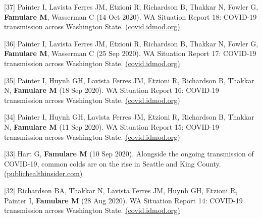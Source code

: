 \documentclass{article}
\begin{document}
\begin{llist}
\begin{items}
	\item[{[37]}] Painter I, Lavista Ferres JM, Etzioni R, Richardson B, Thakkar N, Fowler G, \textbf{Famulare M}, Wasserman C (14 Oct 2020). WA Situation Report 18: COVID-19 transmission across Washington State. \href{https://iazpvnewgrp01.blob.core.windows.net/source/2021-02/reports/pdf/WA_Situation_Report_18_COVID-19_transmission_across_Washington_State.pdf}{(covid.idmod.org)}
	
	
	\item[{[36]}] Painter I, Lavista Ferres JM, Etzioni R, Richardson B, Thakkar N, Fowler G, \textbf{Famulare M}, Wasserman C (25 Sep 2020). WA Situation Report 17: COVID-19 transmission across Washington State. \href{https://iazpvnewgrp01.blob.core.windows.net/source/2021-02/reports/pdf/WA_Situation_Report_17_COVID-19_transmission_across_Washington_State.pdf}{(covid.idmod.org)}
	
	\item[{[35]}] Painter I,  Huynh GH, Lavista Ferres JM, Etzioni R, Richardson B, Thakkar N,  \textbf{Famulare M} (18 Sep 2020). WA Situation Report 16: COVID-19 transmission across Washington State. \href{https://iazpvnewgrp01.blob.core.windows.net/source/2021-02/reports/pdf/WA_Situation_Report_16_COVID-19_transmission_across_Washington_State.pdf}{(covid.idmod.org)}
	
	\item[{[34]}] Painter I,  Huynh GH, Lavista Ferres JM, Etzioni R, Richardson B, Thakkar N,  \textbf{Famulare M} (11 Sep 2020). WA Situation Report 15: COVID-19 transmission across Washington State. \href{https://iazpvnewgrp01.blob.core.windows.net/source/2021-02/reports/pdf/WA_Situation_Report_15_COVID-19_transmission_across_Washington_State.pdf}{(covid.idmod.org)}
	
	\item[{[33]}] Hart G, \textbf{Famulare M} (10 Sep 2020). Alongside the ongoing transmission of COVID-19, common colds are on the rise in Seattle and King County. \href{https://publichealthinsider.com/2020/09/10/alongside-the-ongoing-transmission-of-covid-19-common-colds-are-on-the-rise-in-seattle-and-king-county/}{(publichealthinsider.com)}
	
	\item[{[32]}] Richardson BA, Thakkar N, Lavista Ferres JM, Huynh GH, Etzioni R, Painter I,  \textbf{Famulare M} (28 Aug 2020). WA Situation Report 14: COVID-19 transmission across Washington State. \href{https://iazpvnewgrp01.blob.core.windows.net/source/2021-02/reports/pdf/WA_Situation_Report_14_COVID-19_transmission_across_Washington_State.pdf}{(covid.idmod.org)}
	

\end{items}
\end{llist}
\end{document}
